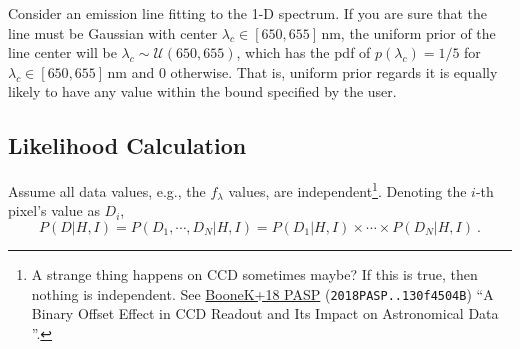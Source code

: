 \begin{ex} 
Consider an emission line fitting to the 1-D spectrum. If you are sure that the line must be Gaussian with center $ \lambda_c \in [650, 655]\,\mathrm{nm} $, the uniform prior of the line center will be $ \lambda_c \sim \mathcal{U}(650, 655) $, which has the pdf of $ p(\lambda_c) = 1/5 $ for $ \lambda_c \in [650, 655]\,\mathrm{nm} $ and 0 otherwise. That is, uniform prior regards it is equally likely to have any value within the bound specified by the user.
\end{ex}




\subsection{Likelihood Calculation}
Assume all data values, e.g., the $ f_\lambda $ values, are independent\footnote{A strange thing happens on CCD sometimes maybe? If this is true, then nothing is independent. See \href{https://ui.adsabs.harvard.edu/abs/2018PASP..130f4504B/abstract}{BooneK+18 PASP} (\texttt{2018PASP..130f4504B}) ``A Binary Offset Effect in CCD Readout and Its Impact on Astronomical Data
''.}. Denoting the $ i $-th pixel's value as $ D_i $, %
\begin{equation*}
  P(D|H, I) = P(D_1, \cdots , D_N | H, I) = P(D_1 | H, I) \times \cdots \times P(D_N | H, I) ~.
\end{equation*}

